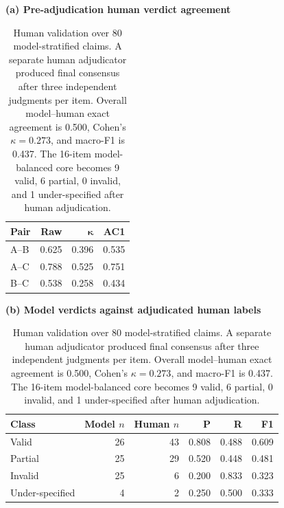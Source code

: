 \begin{table}[t]
\centering
\small
\begin{minipage}[t]{0.43\linewidth}
\centering
\footnotesize
\setlength{\tabcolsep}{3pt}
\textbf{(a) Pre-adjudication human verdict agreement}\\[3pt]
\begin{tabular}{lrrr}
\toprule
\textbf{Pair} & \textbf{Raw} & $\boldsymbol{\kappa}$ & \textbf{AC1} \\
\midrule
A--B & 0.625 & 0.396 & 0.535 \\
A--C & 0.788 & 0.525 & 0.751 \\
B--C & 0.538 & 0.258 & 0.434 \\
\bottomrule
\end{tabular}
\end{minipage}
\hfill
\begin{minipage}[t]{0.54\linewidth}
\centering
\footnotesize
\setlength{\tabcolsep}{3pt}
\textbf{(b) Model verdicts against adjudicated human labels}\\[3pt]
\begin{tabular}{lrrrrr}
\toprule
\textbf{Class} & \textbf{Model $n$} & \textbf{Human $n$} & \textbf{P} & \textbf{R} & \textbf{F1} \\
\midrule
Valid & 26 & 43 & 0.808 & 0.488 & 0.609 \\
Partial & 25 & 29 & 0.520 & 0.448 & 0.481 \\
Invalid & 25 & 6 & 0.200 & 0.833 & 0.323 \\
Under-specified & 4 & 2 & 0.250 & 0.500 & 0.333 \\
\bottomrule
\end{tabular}
\end{minipage}
\caption{Human validation over 80 model-stratified claims. A separate human adjudicator produced final consensus after three independent judgments per item. Overall model--human exact agreement is 0.500, Cohen's $\kappa=0.273$, and macro-F1 is 0.437. The 16-item model-balanced core becomes 9 valid, 6 partial, 0 invalid, and 1 under-specified after human adjudication.}
\label{tab:human-validation-results}
\end{table}
